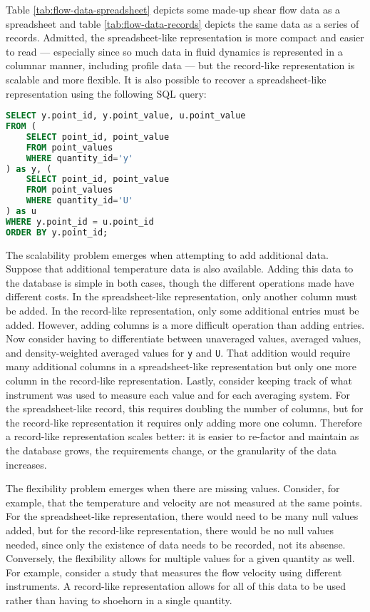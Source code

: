 Table \ref{tab:flow-data-spreadsheet} depicts some made-up shear flow data as a
spreadsheet and table \ref{tab:flow-data-records} depicts the same data as a
series of records.  Admitted, the spreadsheet-like representation is more
compact and easier to read --- especially since so much data in fluid dynamics
is represented in a columnar manner, including profile data --- but the
record-like representation is scalable and more flexible.  It is also possible
to recover a spreadsheet-like representation using the following SQL query:
%
\begin{lstlisting}[language=SQL]
SELECT y.point_id, y.point_value, u.point_value
FROM (
    SELECT point_id, point_value
    FROM point_values
    WHERE quantity_id='y'
) as y, (
    SELECT point_id, point_value
    FROM point_values
    WHERE quantity_id='U'
) as u
WHERE y.point_id = u.point_id
ORDER BY y.point_id;
\end{lstlisting}

The scalability problem emerges when attempting to add additional data.
Suppose that additional temperature data is also available.  Adding this data
to the database is simple in both cases, though the different operations made
have different costs.  In the spreadsheet-like representation, only another
column must be added.  In the record-like representation, only some additional
entries must be added.  However, adding columns is a more difficult operation
than adding entries.  Now consider having to differentiate between unaveraged
values, averaged values, and density-weighted averaged values for \texttt{y}
and \texttt{U}.  That addition would require many additional columns in a
spreadsheet-like representation but only one more column in the record-like
representation.  Lastly, consider keeping track of what instrument was used to
measure each value and for each averaging system.  For the spreadsheet-like
record, this requires doubling the number of columns, but for the record-like
representation it requires only adding more one column.  Therefore a
record-like representation scales better: it is easier to re-factor and
maintain as the database grows, the requirements change, or the granularity of
the data increases.

The flexibility problem emerges when there are missing values.  Consider, for
example, that the temperature and velocity are not measured at the same points.
For the spreadsheet-like representation, there would need to be many null
values added, but for the record-like representation, there would be no null
values needed, since only the existence of data needs to be recorded, not its
absense.  Conversely, the flexibility allows for multiple values for a given
quantity as well.  For example, consider a study that measures the flow
velocity using different instruments.  A record-like representation allows for
all of this data to be used rather than having to shoehorn in a single
quantity.

